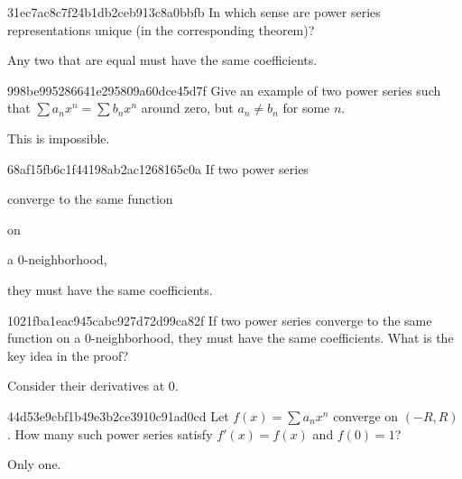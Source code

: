\begin{note}{31ec7ac8c7f24b1db2ceb913c8a0bbfb}
    In which sense are power series representations unique (in the corresponding theorem)?

    \begin{cloze}{1}
        Any two that are equal must have the same coefficients.
    \end{cloze}
\end{note}

\begin{note}{998be995286641e295809a60dce45d7f}
    Give an example of two power series such that \({ \sum a_n x^{n} = \sum b_n x^{n} }\) around zero, but \({ a_n \neq b_n }\) for some \({ n }\).

    \begin{cloze}{1}
        This is impossible.
    \end{cloze}
\end{note}

\begin{note}{68af15fb6c1f44198ab2ac1268165c0a}
    If two power series \begin{icloze}{3}converge to the same function\end{icloze} on \begin{icloze}{2}a \({ 0 }\)-neighborhood,\end{icloze} \begin{icloze}{1}they must have the same coefficients.\end{icloze}
\end{note}

\begin{note}{1021fba1eac945cabc927d72d99ca82f}
    If two power series converge to the same function on a \({ 0 }\)-neighborhood, they must have the same coefficients.
    What is the key idea in the proof?

    \begin{cloze}{1}
        Consider their derivatives at \({ 0 }\).
    \end{cloze}
\end{note}

\begin{note}{44d53e9cbf1b49e3b2ce3910c91ad0cd}
    Let \({ f(x) = \sum a_n x^{n} }\) converge on \({ (-R, R) }\).
    How many such power series satisfy \({ f'(x) = f(x) }\) and \({ f(0) = 1 }\)?

    \begin{cloze}{1}
        Only one.
    \end{cloze}
\end{note}

